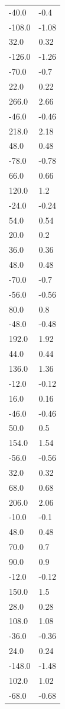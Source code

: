 \begin{longtable}{ll}
-40.0 & -0.4 \\
-108.0 & -1.08 \\
32.0 & 0.32 \\
-126.0 & -1.26 \\
-70.0 & -0.7 \\
22.0 & 0.22 \\
266.0 & 2.66 \\
-46.0 & -0.46 \\
218.0 & 2.18 \\
48.0 & 0.48 \\
-78.0 & -0.78 \\
66.0 & 0.66 \\
120.0 & 1.2 \\
-24.0 & -0.24 \\
54.0 & 0.54 \\
20.0 & 0.2 \\
36.0 & 0.36 \\
48.0 & 0.48 \\
-70.0 & -0.7 \\
-56.0 & -0.56 \\
80.0 & 0.8 \\
-48.0 & -0.48 \\
192.0 & 1.92 \\
44.0 & 0.44 \\
136.0 & 1.36 \\
-12.0 & -0.12 \\
16.0 & 0.16 \\
-46.0 & -0.46 \\
50.0 & 0.5 \\
154.0 & 1.54 \\
-56.0 & -0.56 \\
32.0 & 0.32 \\
68.0 & 0.68 \\
206.0 & 2.06 \\
-10.0 & -0.1 \\
48.0 & 0.48 \\
70.0 & 0.7 \\
90.0 & 0.9 \\
-12.0 & -0.12 \\
150.0 & 1.5 \\
28.0 & 0.28 \\
108.0 & 1.08 \\
-36.0 & -0.36 \\
24.0 & 0.24 \\
-148.0 & -1.48 \\
102.0 & 1.02 \\
-68.0 & -0.68 \\

\end{longtable}
